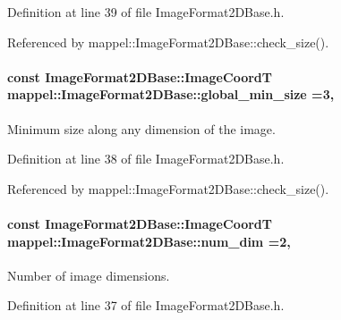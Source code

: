 Definition at line 39 of file Image\+Format2\+D\+Base.\+h.



Referenced by mappel\+::\+Image\+Format2\+D\+Base\+::check\+\_\+size().

\paragraph[{\texorpdfstring{global\+\_\+min\+\_\+size}{global_min_size}}]{\setlength{\rightskip}{0pt plus 5cm}const {\bf Image\+Format2\+D\+Base\+::\+Image\+CoordT} mappel\+::\+Image\+Format2\+D\+Base\+::global\+\_\+min\+\_\+size =3\hspace{0.3cm}{\ttfamily [static]}, {\ttfamily [inherited]}}\hypertarget{classmappel_1_1ImageFormat2DBase_a1149e8545d3cfaa40c2f3bc02e3223b2}{}\label{classmappel_1_1ImageFormat2DBase_a1149e8545d3cfaa40c2f3bc02e3223b2}
Minimum size along any dimension of the image. 

Definition at line 38 of file Image\+Format2\+D\+Base.\+h.



Referenced by mappel\+::\+Image\+Format2\+D\+Base\+::check\+\_\+size().

\paragraph[{\texorpdfstring{num\+\_\+dim}{num_dim}}]{\setlength{\rightskip}{0pt plus 5cm}const {\bf Image\+Format2\+D\+Base\+::\+Image\+CoordT} mappel\+::\+Image\+Format2\+D\+Base\+::num\+\_\+dim =2\hspace{0.3cm}{\ttfamily [static]}, {\ttfamily [inherited]}}\hypertarget{classmappel_1_1ImageFormat2DBase_a9c29fcaf30faffc77b41ba556ebb0127}{}\label{classmappel_1_1ImageFormat2DBase_a9c29fcaf30faffc77b41ba556ebb0127}
Number of image dimensions. 

Definition at line 37 of file Image\+Format2\+D\+Base.\+h.



